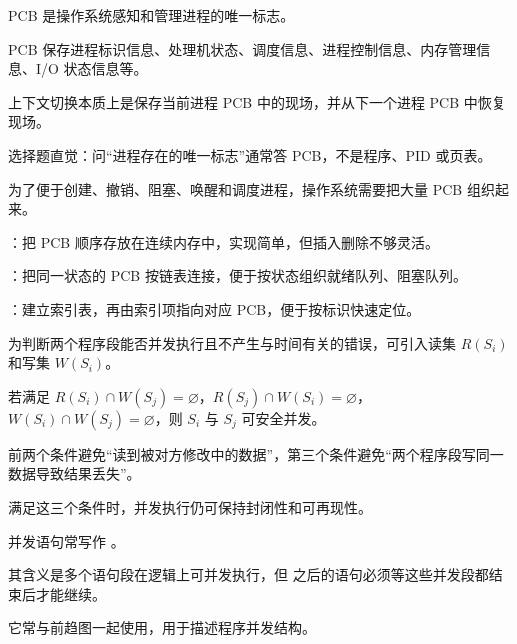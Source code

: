 \begin{points}
  \item PCB 是操作系统感知和管理进程的唯一标志。
  \item PCB 保存进程标识信息、处理机状态、调度信息、进程控制信息、内存管理信息、I/O 状态信息等。
  \item 上下文切换本质上是保存当前进程 PCB 中的现场，并从下一个进程 PCB 中恢复现场。
  \item 选择题直觉：问“进程存在的唯一标志”通常答 PCB，不是程序、PID 或页表。
\end{points}


\begin{points}
  \item 为了便于创建、撤销、阻塞、唤醒和调度进程，操作系统需要把大量 PCB 组织起来。
  \item {}：把 PCB 顺序存放在连续内存中，实现简单，但插入删除不够灵活。
  \item {}：把同一状态的 PCB 按链表连接，便于按状态组织就绪队列、阻塞队列。
  \item {}：建立索引表，再由索引项指向对应 PCB，便于按标识快速定位。
\end{points}


\begin{points}
  \item 为判断两个程序段能否并发执行且不产生与时间有关的错误，可引入读集 $R(S_i)$ 和写集 $W(S_i)$。
  \item 若满足 $R(S_i)\cap W(S_j)=\varnothing$，$R(S_j)\cap W(S_i)=\varnothing$，$W(S_i)\cap W(S_j)=\varnothing$，则 $S_i$ 与 $S_j$ 可安全并发。
  \item 前两个条件避免“读到被对方修改中的数据”，第三个条件避免“两个程序段写同一数据导致结果丢失”。
  \item 满足这三个条件时，并发执行仍可保持封闭性和可再现性。
\end{points}


\begin{points}
  \item 并发语句常写作 。
  \item 其含义是多个语句段在逻辑上可并发执行，但  之后的语句必须等这些并发段都结束后才能继续。
  \item 它常与前趋图一起使用，用于描述程序并发结构。
\end{points}

